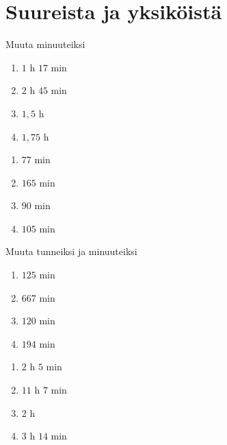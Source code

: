 \chapter{Suureista ja yksiköistä}

\begin{tehtava}
Muuta minuuteiksi
\begin{enumerate}
\item $1$ h $17$ min
\item $2$ h $45$ min
\item $1,5$ h
\item $1,75$ h
\end{enumerate}
\begin{vastaus}
\begin{enumerate}
\item $77$ min
\item $165$ min
\item $90$ min
\item $105$ min
\end{enumerate}
\end{vastaus}
\end{tehtava}

\begin{tehtava}
Muuta tunneiksi ja minuuteiksi
\begin{enumerate}
\item $125$ min
\item $667$ min
\item $120$ min
\item $194$ min
\end{enumerate}
\begin{vastaus}
\begin{enumerate}
\item $2$ h $5$ min
\item $11$ h $7$ min
\item $2$ h
\item $3$ h $14$ min
\end{enumerate}
\end{vastaus}
\end{tehtava}
